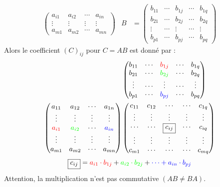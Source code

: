 \begin{definition}
\begin{enumerate}
\begin{align*}
\begin{pmatrix}
                a_{i1} & a_{i2} & \cdots & a_{in} \\ 
                \vdots & \vdots & \vdots & \vdots \\
                a_{m1} & a_{m2} & \cdots & a_{mn}
            \end{pmatrix}
            &
            B &= 
            \begin{pmatrix}
                b_{11} & \cdots & b_{1j} & \cdots & b_{1q} \\
                b_{21} & \cdots & b_{2j} & \cdots & b_{2q} \\
                \vdots & \cdots & \vdots & \cdots & \vdots \\
                b_{p1} & \cdots & b_{pj} & \cdots & b_{pq}
            \end{pmatrix}
        \end{align*}
        Alors le coefficient $(C)_{ij}$ pour $C = AB$ est donné par :
        \begin{align*}
            &\begin{pmatrix}
                b_{11} & \cdots & \color{red}b_{1j} & \cdots & b_{1q} \\
                b_{21} & \cdots & \color{green}b_{2j} & \cdots & b_{2q} \\
                \vdots & \cdots & \vdots & \cdots & \vdots \\
                b_{p1} & \cdots & \color{blue}b_{pj} & \cdots & b_{pq}
            \end{pmatrix}
            \\
            \begin{pmatrix}
                a_{11} & a_{12} & \cdots & a_{1n} \\ 
                \vdots & \vdots & \vdots & \vdots \\
                \color{red}a_{i1} & \color{green}a_{i2} & \cdots & \color{blue}a_{in} \\ 
                \vdots & \vdots & \vdots & \vdots \\
                a_{m1} & a_{m2} & \cdots & a_{mn}
            \end{pmatrix}
            &\begin{pmatrix}
                c_{11} & c_{12} & \cdots & \cdots & c_{1q} \\
                \vdots & \vdots & \vdots & \vdots & \vdots \\
                \cdots & \cdots & \boxed{c_{ij}} & \cdots & c_{iq} \\
                \vdots & \vdots & \vdots & \vdots & \vdots \\
                c_{m1} & \cdots & \cdots & \cdots & c_{mq}
            \end{pmatrix}
        \end{align*}
        \[ \boxed{c_{ij}} = \color{red}a_{i1} \cdot b_{1j} \color{black}+ \color{green} a_{i2} \cdot b_{2j} \color{black}+ \color{blue}\cdots + a_{in} \cdot b_{pj} \]
		Attention, la multiplication n'est pas commutative $(AB \neq BA)$.
	\end{enumerate}
\end{definition}

